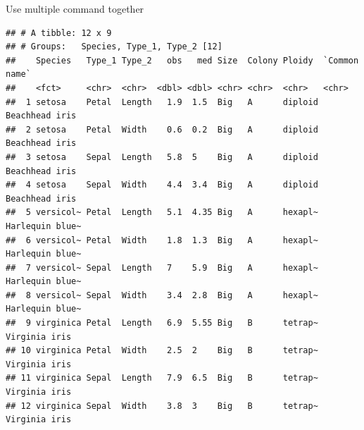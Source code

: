 \documentclass[14pt,ignorenonframetext,]{bredelebeamer}
\newenvironment{Shaded}{\begin{snugshade}}{\end{snugshade}}
\newcommand{\KeywordTok}[1]{\textcolor[rgb]{0.94,0.87,0.69}{#1}}
\newcommand{\DataTypeTok}[1]{\textcolor[rgb]{0.87,0.87,0.75}{#1}}
\newcommand{\DecValTok}[1]{\textcolor[rgb]{0.86,0.86,0.80}{#1}}
\newcommand{\CharTok}[1]{\textcolor[rgb]{0.86,0.64,0.64}{#1}}
\newcommand{\StringTok}[1]{\textcolor[rgb]{0.80,0.58,0.58}{#1}}
\newcommand{\OperatorTok}[1]{\textcolor[rgb]{0.94,0.94,0.82}{#1}}
\newcommand{\NormalTok}[1]{\textcolor[rgb]{0.80,0.80,0.80}{#1}}
\begin{document}
\begin{frame}[fragile]{Use multiple command together}

\small

\begin{Shaded}
\end{Shaded}

\begin{verbatim}
## # A tibble: 12 x 9
## # Groups:   Species, Type_1, Type_2 [12]
##    Species   Type_1 Type_2   obs   med Size  Colony Ploidy  `Common name`  
##    <fct>     <chr>  <chr>  <dbl> <dbl> <chr> <chr>  <chr>   <chr>          
##  1 setosa    Petal  Length   1.9  1.5  Big   A      diploid Beachhead iris 
##  2 setosa    Petal  Width    0.6  0.2  Big   A      diploid Beachhead iris 
##  3 setosa    Sepal  Length   5.8  5    Big   A      diploid Beachhead iris 
##  4 setosa    Sepal  Width    4.4  3.4  Big   A      diploid Beachhead iris 
##  5 versicol~ Petal  Length   5.1  4.35 Big   A      hexapl~ Harlequin blue~
##  6 versicol~ Petal  Width    1.8  1.3  Big   A      hexapl~ Harlequin blue~
##  7 versicol~ Sepal  Length   7    5.9  Big   A      hexapl~ Harlequin blue~
##  8 versicol~ Sepal  Width    3.4  2.8  Big   A      hexapl~ Harlequin blue~
##  9 virginica Petal  Length   6.9  5.55 Big   B      tetrap~ Virginia iris  
## 10 virginica Petal  Width    2.5  2    Big   B      tetrap~ Virginia iris  
## 11 virginica Sepal  Length   7.9  6.5  Big   B      tetrap~ Virginia iris  
## 12 virginica Sepal  Width    3.8  3    Big   B      tetrap~ Virginia iris
\end{verbatim}

\end{frame}
\end{document}

